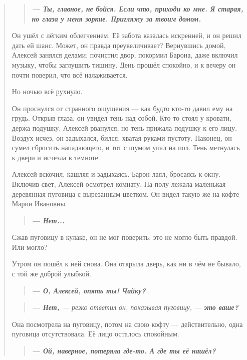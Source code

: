\documentclass[12pt,a4paper]{book}
\newenvironment{dialogue}{\begin{quote}\itshape}{\end{quote}} %
\begin{document}
\begin{dialogue}
\begin{dialogue}
\textbf{--- Ты, главное, не бойся. Если что, приходи ко мне. Я старая, но глаза у меня зоркие. Пригляжу за твоим домом.}
\end{dialogue}

Он ушёл с лёгким облегчением. Её забота казалась искренней, и он решил дать ей шанс. Может, он правда преувеличивает? Вернувшись домой, Алексей занялся делами: почистил двор, покормил Барона, даже включил музыку, чтобы заглушить тишину. День прошёл спокойно, и к вечеру он почти поверил, что всё налаживается.

Но ночью всё рухнуло.

Он проснулся от странного ощущения --- как будто кто-то давил ему на грудь. Открыв глаза, он увидел тень над собой. Кто-то стоял у кровати, держа подушку. Алексей рванулся, но тень прижала подушку к его лицу. Воздух исчез, он задыхался, бился, хватая руками пустоту. Наконец, он сумел сбросить нападающего, и тот с шумом упал на пол. Тень метнулась к двери и исчезла в темноте.

Алексей вскочил, кашляя и задыхаясь. Барон лаял, бросаясь к окну. Включив свет, Алексей осмотрел комнату. На полу лежала маленькая деревянная пуговица с вырезанным цветком. Он видел такую же на кофте Марии Ивановны.

\begin{dialogue}
\textbf{--- Нет...}
\end{dialogue}

Сжав пуговицу в кулаке, он не мог поверить: это не могло быть правдой. Или могло?

Утром он пошёл к ней снова. Она открыла дверь, как ни в чём не бывало, с той же доброй улыбкой.

\begin{dialogue}
\textbf{--- О, Алексей, опять ты! Чайку?}
\end{dialogue}

\begin{dialogue}
\textbf{--- Нет,} --- резко ответил он, показывая пуговицу, --- \textbf{это ваше?}
\end{dialogue}

Она посмотрела на пуговицу, потом на свою кофту --- действительно, одна пуговица отсутствовала. Её лицо осталось спокойным.

\begin{dialogue}
\textbf{--- Ой, наверное, потеряла где-то. А где ты её нашёл?}
\end{dialogue}


\end{dialogue}
\end{document}
